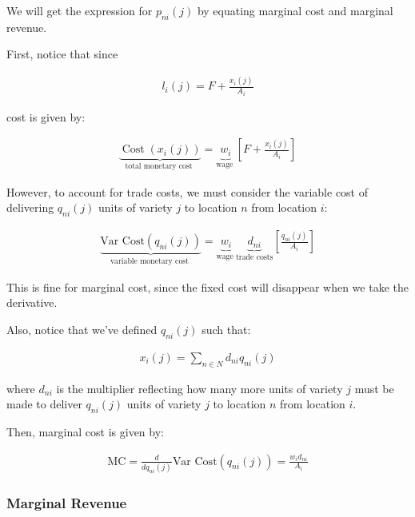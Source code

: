 \documentclass[10pt]{article}
\begin{document}
We will get the expression 
for $p_{n i}(j)$ by equating 
marginal cost and marginal revenue.

First, notice that since 

\begin{align}
    l_i(j)=F+\frac{x_i(j)}{A_i}
\end{align}

cost is given by:

\begin{align}
    \underbrace{\operatorname{Cost}\left(x_i(j)\right)}_{\text {total monetary cost }}=\underbrace{w_i}_{\text {wage }}\left[F+\frac{x_i(j)}{A_i}\right] \label{eq:cost_xij}
\end{align}

However, to account for trade costs,
we must consider the variable cost of 
delivering $q_{ni}(j)$ units of variety $j$
to location $n$ from location $i$:

\begin{align}
    \underbrace{\text{Var Cost}\left(q_{ni}(j)\right)}_{\text {variable monetary cost }}=\underbrace{w_i}_{\text {wage }} \underbrace{d_{ni}}_{\text{trade costs}} \left[\frac{q_{ni}(j)}{A_i}\right] \label{eq:var_cost_qnij}
\end{align}

This is fine for marginal cost, since the fixed cost 
will disappear when we take the derivative.

Also, notice that we've defined $q_{ni}(j)$ such that:

\begin{align}
    x_i(j) = \sum_{n \in N} d_{ni} q_{ni}(j) \label{eq:xij_qnij}
\end{align}

where $d_{ni}$ is the multiplier reflecting 
how many more units of variety $j$ must be made 
to deliver $q_{ni}(j)$ units of variety $j$ to location $n$
from location $i$.

Then, marginal cost is given by:

\begin{align}
    \text{MC} = \frac{d}{d q_{ni}(j)} \text{Var Cost}\left(q_{ni}(j)\right)= \frac{w_i d_{ni}}{A_i}
\end{align}

\subsubsection{Marginal Revenue}
\end{document}
